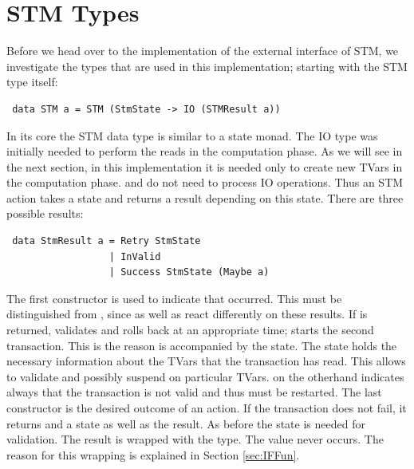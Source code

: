 \section{STM Types}
\label{STMTypes}
Before we head over to the implementation of the external interface of STM, we investigate the types
that are used in this implementation; starting with the STM type itself:
\begin{lstlisting}
 data STM a = STM (StmState -> IO (STMResult a))
\end{lstlisting}
In its core the STM data type is similar to a state monad. The IO type was initially needed to perform the reads 
in the computation phase. As we will see in the next section, in this implementation it is needed only to create new TVars
in the computation phase.  and  do not need to process IO operations.
Thus an STM action takes a state and returns a result depending on this state. There are three possible 
results:
\begin{lstlisting}
 data StmResult a = Retry StmState
                  | InValid
                  | Success StmState (Maybe a)
\end{lstlisting}
The first constructor is used to indicate that  occurred. This must be distinguished from 
, since  as well as  react differently on these results. If 
 is returned,  validates and rolls back at an appropriate time;  
starts the second transaction. This is the reason  is accompanied by the state.
The state holds the necessary information about the TVars that the transaction has read. This allows 
to validate and possibly suspend on particular TVars.  on the otherhand indicates
always that the transaction is not valid and thus must be restarted. 
The last constructor is the desired outcome of an action. If the transaction does not fail, it returns
 and a state as well as the result. As before the state is needed for validation.
The result is wrapped with the  type. The value  never occurs. 
The reason for this wrapping is explained in Section \ref{sec:IFFun}. 

